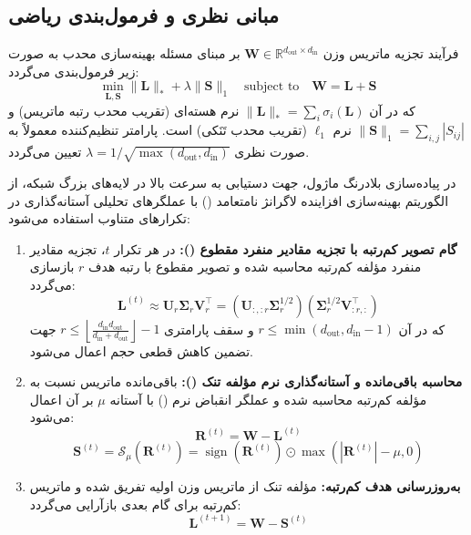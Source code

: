 \subsection{مبانی نظری و فرمول‌بندی ریاضی}
فرآیند تجزیه ماتریس وزن $\mathbf{W} \in \mathbb{R}^{d_{\text{out}} \times d_{\text{in}}}$ بر مبنای مسئله بهینه‌سازی محدب  به صورت زیر فرمول‌بندی می‌گردد:
\begin{equation}
\min_{\mathbf{L}, \mathbf{S}} \|\mathbf{L}\|_* + \lambda \|\mathbf{S}\|_1 \quad \text{subject to} \quad \mathbf{W} = \mathbf{L} + \mathbf{S}
\end{equation}
که در آن $\|\mathbf{L}\|_* = \sum_i \sigma_i(\mathbf{L})$ نرم هسته‌ای (تقریب محدب رتبه ماتریس) و $\|\mathbf{S}\|_1 = \sum_{i,j} |S_{ij}|$ نرم $\ell_1$ (تقریب محدب تَنَکی) است. پارامتر تنظیم‌کننده معمولاً به صورت نظری $\lambda = 1 / \sqrt{\max(d_{\text{out}}, d_{\text{in}})}$ تعیین می‌گردد.

در پیاده‌سازی بلادرنگ ماژول، جهت دستیابی به سرعت بالا در لایه‌های بزرگ شبکه، از الگوریتم بهینه‌سازی افزاینده لاگرانژ نامتعامد () با عملگرهای تحلیلی آستانه‌گذاری در تکرارهای متناوب استفاده می‌شود:

\begin{enumerate}
    \item \textbf{گام تصویر کم‌رتبه با تجزیه مقادیر منفرد مقطوع ():}
    در هر تکرار $t$، تجزیه مقادیر منفرد مؤلفه کم‌رتبه محاسبه شده و تصویر مقطوع با رتبه هدف $r$ بازسازی می‌گردد:
    \begin{equation}
    \mathbf{L}^{(t)} \approx \mathbf{U}_r \mathbf{\Sigma}_r \mathbf{V}_r^\top = \left(\mathbf{U}_{:, :r} \mathbf{\Sigma}_r^{1/2}\right) \left(\mathbf{\Sigma}_r^{1/2} \mathbf{V}_{:r, :}^\top\right)
    \end{equation}
    که در آن $r \le \min(d_{\text{out}}, d_{\text{in}} - 1)$ و سقف پارامتری $r \le \left\lfloor \frac{d_{\text{in}} d_{\text{out}}}{d_{\text{in}} + d_{\text{out}}} \right\rfloor - 1$ جهت تضمین کاهش قطعی حجم اعمال می‌شود.

    \item \textbf{محاسبه باقی‌مانده و آستانه‌گذاری نرم مؤلفه تنک ():}
    باقی‌مانده ماتریس نسبت به مؤلفه کم‌رتبه محاسبه شده و عملگر انقباض نرم () با آستانه $\mu$ بر آن اعمال می‌شود:
    \begin{equation}
    \mathbf{R}^{(t)} = \mathbf{W} - \mathbf{L}^{(t)}
    \end{equation}
    \begin{equation}
    \mathbf{S}^{(t)} = \mathcal{S}_{\mu}(\mathbf{R}^{(t)}) = \operatorname{sign}(\mathbf{R}^{(t)}) \odot \max(|\mathbf{R}^{(t)}| - \mu, 0)
    \end{equation}

    \item \textbf{به‌روزرسانی هدف کم‌رتبه:}
    مؤلفه تنک از ماتریس وزن اولیه تفریق شده و ماتریس کم‌رتبه برای گام بعدی بازآرایی می‌گردد:
    \begin{equation}
    \mathbf{L}^{(t+1)} = \mathbf{W} - \mathbf{S}^{(t)}
    \end{equation}
\end{enumerate}

